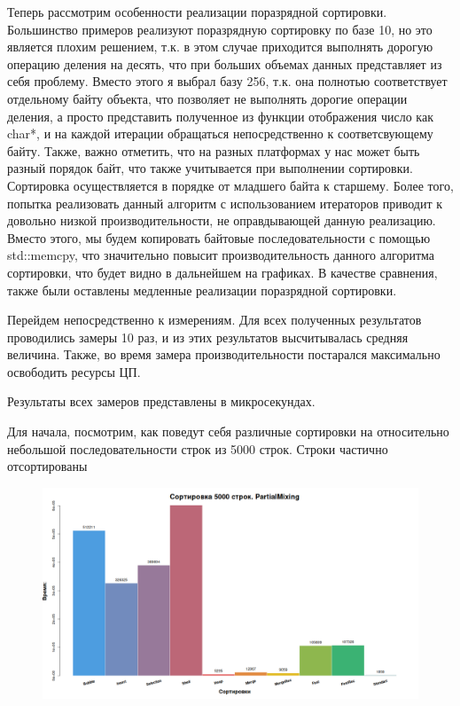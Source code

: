 \documentclass[a4paper, 14pt]{report}
\begin{document}
Теперь рассмотрим особенности реализации поразрядной сортировки. Большинство примеров реализуют поразрядную сортировку по базе 10, но это является плохим решением, т.к. в этом случае приходится выполнять дорогую операцию деления на десять, что при больших объемах данных представляет из себя проблему. Вместо этого я выбрал базу 256, т.к. она полнотью соответствует отдельному байту объекта, что позволяет не выполнять дорогие операции деления, а просто представить полученное из функции отображения число как char*, и на каждой итерации обращаться непосредственно к соответсвующему байту. Также, важно отметить, что на разных платформах у нас может быть разный порядок байт, что также учитывается при выполнении сортировки. Сортировка осуществляется в порядке от младшего байта к старшему. Более того, попытка реализовать данный алгоритм с использованием итераторов приводит к довольно низкой производительности, не оправдывающей данную реализацию. Вместо этого, мы будем копировать байтовые последовательности с помощью std::memcpy, что значительно повысит производительность данного алгоритма сортировки, что будет видно в дальнейшем на графиках. В качестве сравнения, также были оставлены медленные реализации поразрядной сортировки.

Перейдем непосредственно к измерениям. Для всех полученных результатов проводились замеры 10 раз, и из этих результатов высчитывалась средняя величина. Также, во время замера производительности
постарался максимально освободить ресурсы ЦП.

Результаты всех замеров представлены в микросекундах.

Для начала, посмотрим, как поведут себя различные сортировки на относительно небольшой последовательности строк из 5000 строк. Строки частично отсортированы

\begin{figure}[h]
	
	\centering
	
	\includegraphics[width=0.8\linewidth]{./images/small_str.png}
	
	
	\label{fig:mpr}
	
\end{figure}
\end{document}
